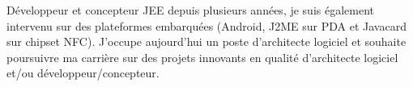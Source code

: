 \par{
Développeur et concepteur JEE depuis plusieurs années, je suis également intervenu sur des plateformes 
embarquées (Android, J2ME sur PDA et Javacard sur chipset NFC). J'occupe
aujourd'hui un poste d'architecte logiciel et souhaite poursuivre ma carrière sur des projets innovants en 
qualité d'architecte logiciel et/ou développeur/concepteur.
}